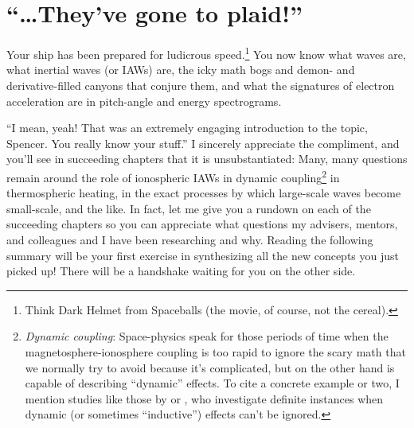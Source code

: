 







\section{``\dots They've gone to plaid!''}

Your ship has been prepared for ludicrous speed.\footnote{Think Dark Helmet from
  Spaceballs (the movie, of course, not the cereal).} You now know what \Alf
waves are, what inertial \Alf waves (or IAWs) are, the icky math bogs and demon-
and derivative-filled canyons that conjure them, and what the signatures of
\Alfic electron acceleration are in pitch-angle and energy spectrograms.

``I mean, yeah! That was an extremely engaging introduction to the topic,
Spencer. You really know your stuff.'' I sincerely appreciate the compliment,
and you'll see in succeeding chapters that it is unsubstantiated: Many, many
questions remain around the role of ionospheric IAWs in dynamic
coupling\footnote{\textit{Dynamic coupling}: Space-physics speak for those
  periods of time when the magnetosphere-ionosphere coupling is too rapid to
  ignore the scary math that we normally try to avoid because it's complicated,
  but on the other hand is capable of describing ``dynamic'' effects. To cite a
  concrete example or two, I mention studies like those by \citet{Mishin2015} or
  \citet{Verkhoglyadova2016}, who investigate definite instances when dynamic
  (or sometimes ``inductive'') effects can't be ignored.} in thermospheric
heating, in the exact processes by which large-scale waves become small-scale,
and the like. In fact, let me give you a rundown on each of the succeeding
chapters so you can appreciate what questions my advisers, mentors, and
colleagues and I have been researching and why. Reading the following summary
will be your first exercise in synthesizing all the new concepts you just picked
up! There will be a handshake waiting for you on the other side.

